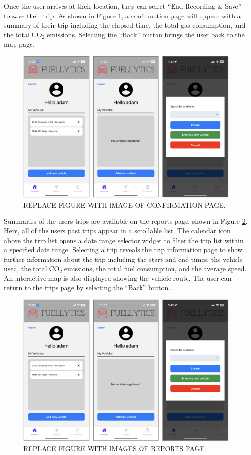 \documentclass[11pt, oneside]{article}
\begin{document}
Once the user arrives at their location, they can select ``End Recording \& Save'' to save their trip.  As shown in Figure \ref*{fig:confirmation}, a confirmation page will appear with a summary of their trip including the elapsed time, the total gas consumption, and the total CO$_2$ emissions.
Selecting the ``Back'' button brings the user back to the map page.
\begin{figure}[H]
\centerline{\includegraphics[width=16.5cm]{img/homepage.png}}
\caption{\label{fig:confirmation} REPLACE FIGURE WITH IMAGE OF CONFIRMATION PAGE.}
\end{figure}

Summaries of the users trips are available on the reports page, shown in Figure \ref*{fig:reports}.
Here, all of the users past trips appear in a scrollable list. The calendar icon above the trip list opens a date range selector widget to filter the trip list within a specified date range. Selecting a trip reveals the trip information page to show further information about the trip including the start and end times, the vehicle used, the total CO$_2$ emissions, the total fuel consumption, and the average speed.  An interactive map is also displayed showing the vehicle route. The user can return to the trips page by selecting the ``Back'' button.
\begin{figure}[H]
\centerline{\includegraphics[width=16.5cm]{img/homepage.png}}
\caption{\label{fig:reports} REPLACE FIGURE WITH IMAGES OF REPORTS PAGE.}
\end{figure}
\end{document}
